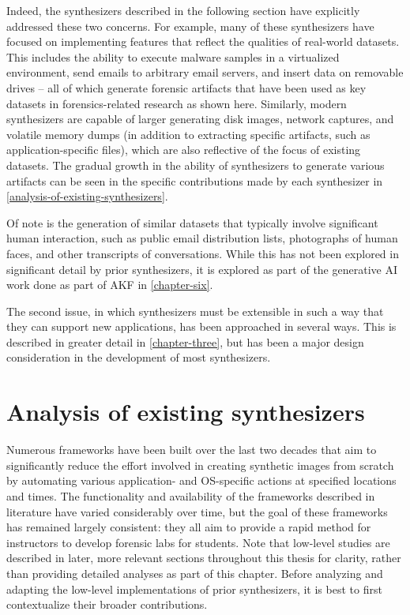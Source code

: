 \documentclass[letterpaper,12pt]{report}
\begin{document}
Indeed, the synthesizers described in the following section have
explicitly addressed these two concerns. For example, many of these
synthesizers have focused on implementing features that reflect the
qualities of real-world datasets. This includes the ability to execute
malware samples in a virtualized environment, send emails to arbitrary
email servers, and insert data on removable drives -- all of which
generate forensic artifacts that have been used as key datasets in
forensics-related research as shown here. Similarly, modern synthesizers
are capable of larger generating disk images, network captures, and
volatile memory dumps (in addition to extracting specific artifacts,
such as application-specific files), which are also reflective of the
focus of existing datasets. The gradual growth in the ability of
synthesizers to generate various artifacts can be seen in the specific
contributions made by each synthesizer in \autoref{analysis-of-existing-synthesizers}.

Of note is the generation of similar datasets that typically involve
significant human interaction, such as public email distribution lists,
photographs of human faces, and other transcripts of conversations.
While this has not been explored in significant detail by prior
synthesizers, it is explored as part of the generative AI work done as
part of AKF in \autoref{chapter-six}.

The second issue, in which synthesizers must be extensible in such a way
that they can support new applications, has been approached in several
ways. This is described in greater detail in \autoref{chapter-three}, but has been a major design consideration in the
development of most synthesizers.

\section{Analysis of existing
synthesizers}\label{analysis-of-existing-synthesizers}

Numerous frameworks have been built over the last two decades that aim
to significantly reduce the effort involved in creating synthetic images
from scratch by automating various application- and OS-specific actions
at specified locations and times. The functionality and availability of
the frameworks described in literature have varied considerably over
time, but the goal of these frameworks has remained largely consistent:
they all aim to provide a rapid method for instructors to develop
forensic labs for students. Note that low-level studies are described in
later, more relevant sections throughout this thesis for clarity, rather
than providing detailed analyses as part of this chapter. Before
analyzing and adapting the low-level implementations of prior
synthesizers, it is best to first contextualize their broader
contributions.
\end{document}
